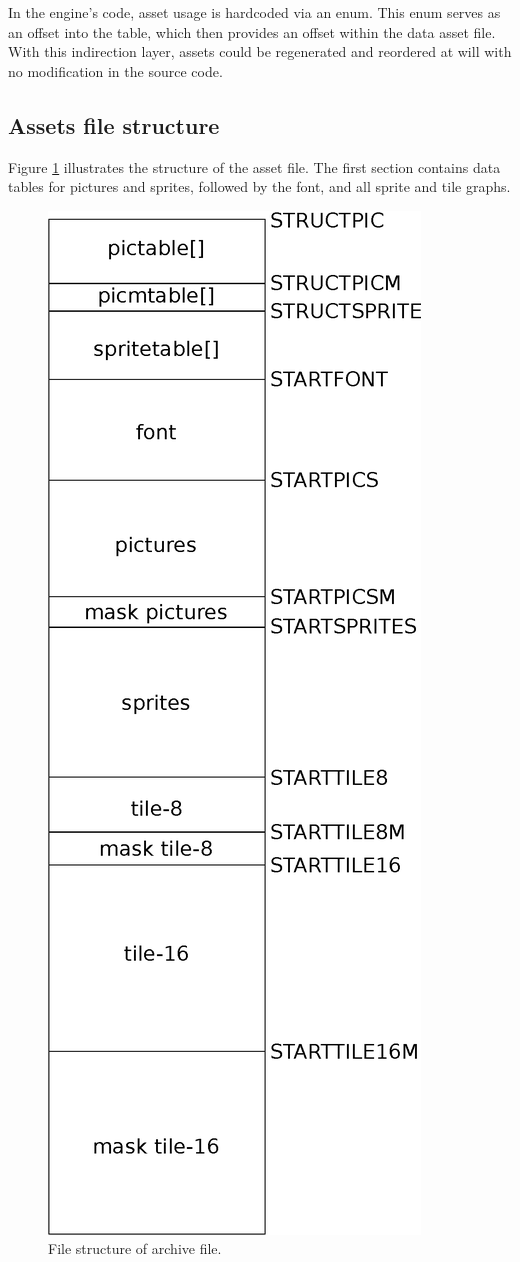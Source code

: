\documentclass[book.tex]{subfiles}
\begin{document}
\par
In the engine's code, asset usage is hardcoded via an enum. This enum serves as an offset into the  table, which then provides an offset within the data asset file. With this indirection layer, assets could be regenerated and reordered at will with no modification in the source code.\\



\par
\begin{minipage}{\textwidth}
 \par
 \end{minipage}
  

\subsection{Assets file structure}
\label{section:asset_file_structure}
Figure \ref{fig:asset-file} illustrates the structure of the  asset file. The first section contains data tables for pictures and sprites, followed by the font, and all sprite and tile graphs. 

\begin{figure}[H]
\centering
 \includegraphics[width=.4\textwidth]{imgs/drawings/graphic_assets.eps}
 \caption{File structure of  archive file.}
 \label{fig:asset-file}
\end{figure}
\end{document}
